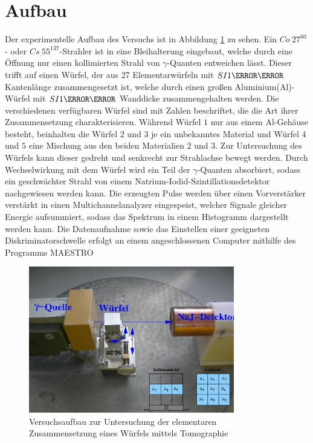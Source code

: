 \section{Aufbau}
\label{sec:Aufbau}

Der experimentelle Aufbau des Versuchs ist in Abbildung \ref{fig:aufbau} zu sehen.
Ein $Co_.{27}^\text{60}$- oder $Cs_.{55}^\text{137}$-Strahler ist in eine Bleihalterung eingebaut, welche durch eine Öffnung nur einen kollimierten Strahl von $\gamma$-Quanten entweichen lässt. Dieser trifft auf einen Würfel, der aus 27 Elementarwürfeln mit $SI{1}{\centi\meter}$ Kantenlänge zusammengesetzt ist, welche durch einen großen Aluminium(Al)-Würfel mit $SI{1}{\milli\meter}$ Wanddicke zusammengehalten werden.
Die verschiedenen verfügbaren Würfel sind mit Zahlen beschriftet, die die Art ihrer Zusammensetzung charakterisieren. Während Würfel $1$ nur aus einem Al-Gehäuse besteht, beinhalten die Würfel $2$ und $3$ je ein unbekanntes Material und Würfel $4$ und $5$ eine Mischung aus den beiden Materialien $2$ und $3$.
Zur Untersuchung des Würfels kann dieser gedreht und senkrecht zur Strahlachse bewegt werden.
Durch Wechselwirkung mit dem Würfel wird ein Teil der $\gamma$-Quanten absorbiert, sodass ein geschwächter Strahl von einem Natrium-Iodid-Szintillationsdetektor nachgewiesen werden kann. Die erzeugten Pulse werden über einen Vorverstärker verstärkt in einen Multichannelanalyzer eingespeist, welcher Signale gleicher Energie aufsummiert, sodass das Spektrum in einem Histogramm dargestellt werden kann.
Die Datenaufnahme sowie das Einstellen einer geeigneten Diskriminatorschwelle erfolgt an einem angeschlossenen Computer mithilfe des Programms MAESTRO
\begin{figure}
\centering
\includegraphics[keepaspectratio,width=0.8\textwidth]{content/images/aufbau.png}
\caption{Versuchsaufbau zur Untersuchung der elementaren Zusammensetzung eines Würfels mittels Tomographie\cite{V14}}
\label{fig:aufbau}
\end{figure}